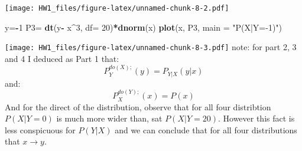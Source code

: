 \documentclass[]{article}
\newenvironment{Shaded}{\begin{snugshade}}{\end{snugshade}}
\newcommand{\DataTypeTok}[1]{\textcolor[rgb]{0.13,0.29,0.53}{#1}}
\newcommand{\DecValTok}[1]{\textcolor[rgb]{0.00,0.00,0.81}{#1}}
\newcommand{\KeywordTok}[1]{\textcolor[rgb]{0.13,0.29,0.53}{\textbf{#1}}}
\newcommand{\NormalTok}[1]{#1}
\newcommand{\OperatorTok}[1]{\textcolor[rgb]{0.81,0.36,0.00}{\textbf{#1}}}
\newcommand{\StringTok}[1]{\textcolor[rgb]{0.31,0.60,0.02}{#1}}
\begin{document}
\texttt{[image: HW1\_files/figure-latex/unnamed-chunk-8-2.pdf]}

\begin{Shaded}
\begin{Highlighting}[]
\NormalTok{y=}\OperatorTok{-}\DecValTok{1}
\NormalTok{P3=}\StringTok{ }\KeywordTok{dt}\NormalTok{(y}\OperatorTok{-}\StringTok{ }\NormalTok{x}\OperatorTok{^}\DecValTok{3}\NormalTok{, }\DataTypeTok{df=} \DecValTok{20}\NormalTok{)}\OperatorTok{*}\KeywordTok{dnorm}\NormalTok{(x)}
\KeywordTok{plot}\NormalTok{(x, P3, }\DataTypeTok{main =} \StringTok{"P(X|Y=-1)"}\NormalTok{)}
\end{Highlighting}
\end{Shaded}

\texttt{[image: HW1\_files/figure-latex/unnamed-chunk-8-3.pdf]} note: for
part 2, 3 and 4 I deduced as Part 1 that:
\[P_{Y}^{do(X);}(y)= P_{Y|X}(y|x)\] and: \[P_{X}^{do(Y);}(x)= P(x)\] And
for the direct of the distribution, observe that for all four
distribtion \(P(X|Y=0)\) is much more wider than, sat \(P(X|Y= 20)\).
However this fact is less conspicuous for \(P(Y|X)\) and we can conclude
that for all four distributions that \(x \to y\).
\end{document}
